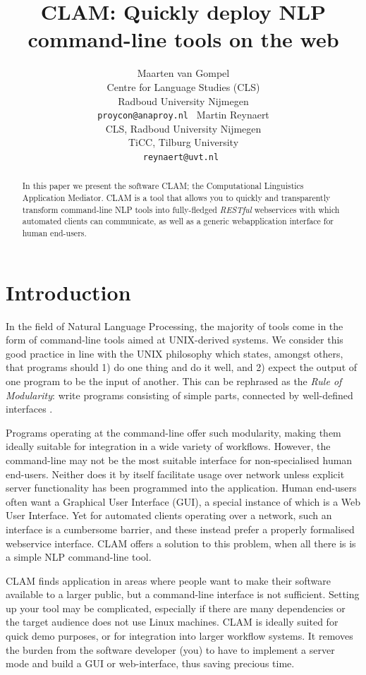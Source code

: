 \documentclass[11pt]{article}
\title{CLAM: Quickly deploy NLP command-line tools on the web}
\author{Maarten van Gompel \\ 
  Centre for Language Studies (CLS) \\
  Radboud University Nijmegen \\
  {\tt proycon@anaproy.nl } \And 
  Martin Reynaert \\
  CLS, Radboud University Nijmegen \\
  TiCC, Tilburg University  \\
  {\tt reynaert@uvt.nl } 
  }
\date{}
\begin{document}
\maketitle

\begin{abstract}
In this paper we present the software CLAM; the Computational Linguistics
Application Mediator. CLAM is a tool that allows you to quickly and
transparently transform command-line NLP tools into fully-fledged
\emph{RESTful}\/ webservices with which automated clients can communicate, as
well as a generic webapplication interface for human end-users.
\end{abstract}


\section{Introduction}

In the field of Natural Language Processing, the majority of tools come in the
form of command-line tools aimed at UNIX-derived systems. We consider this good
practice in line with the UNIX philosophy \cite{unixphilo} which states,
amongst others, that programs should 1) do one thing and do it well, and 2) expect the output of one
program to be the input of another. This can be rephrased as the \emph{Rule of
Modularity}: write programs consisting of simple parts, connected by
well-defined interfaces \cite{RAYMOND2004}.

Programs operating at the command-line
offer such modularity, making them ideally suitable for integration in a
wide variety of workflows. However, the command-line may not be the most suitable interface for non-specialised
human end-users. Neither does it by itself facilitate usage over network unless
explicit server functionality has been programmed into the application.
Human end-users often want a Graphical User Interface (GUI), a special instance of which
is a Web User Interface. Yet for automated clients operating over a network, such an interface is a
cumbersome barrier, and these instead prefer a properly formalised webservice
interface. CLAM offers a solution to this problem, when all there is is a
simple NLP command-line tool.

CLAM finds application in areas where people want to make their software
available to a larger public, but a command-line interface is not sufficient.
Setting up your tool may be complicated, especially if there are many
dependencies or the target audience does not use Linux machines. CLAM is
ideally suited for quick demo purposes, or for integration into larger workflow
systems. It removes the burden from the software developer (you) to have to
implement a server mode and build a GUI or web-interface, thus saving precious
time.
\end{document}
